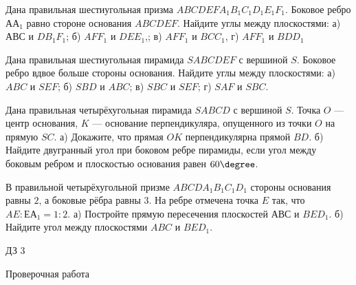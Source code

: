 \begin{homework}[number=2]
	\begin{listofex}
		\item Дана правильная шестиугольная призма \(ABCDEFA_1B_1C_1D_1E_1F_1\). Боковое ребро \(АА_1\) равно стороне основания \(ABCDEF\). Найдите углы между плоскостями: а) \(АВС\) и \(DB_1F_1\); б) \(AFF_1\) и \(DEE_1\),; в) \(AFF_1\) и \(BCC_1\), г) \(AFF_1\) и \(BDD_1\)
		\item Дана правильная шестиугольная пирамида \(SABCDEF\) с вершиной \(S\). Боковое ребро вдвое больше стороны основания. Найдите углы между плоскостями: а) \(ABC\) и \(SEF\); б) \(SBD\) и \(ABC\); в) \(SBC\) и \(SEF\); г) \(SAF\) и \(SBC\).
		\item Дана правильная четырёхугольная пирамида \(SABCD\) с вершиной \(S\). Точка \(O\) --- центр основания, \(K\) --- основание перпендикуляра, опущенного из точки \(O\) на прямую \(SC\). а) Докажите, что прямая \(OK\) перпендикулярна прямой \(BD\). б) Найдите двугранный угол при боковом ребре пирамиды, если угол между боковым ребром и плоскостью основания равен \(60 \degree \).
		\item В правильной четырёхугольной призме \(ABCDA_1B_1C_1D_1\) стороны основания равны \(2\), а боковые рёбра равны \(3\). На ребре отмечена точка \(E\) так, что \(AE: ЕА_1 = 1:2\). а) Постройте прямую пересечения плоскостей \(АВС\) и \(BED_1\). б) Найдите угол между плоскостями \(ABC\) и \(BED_1\).
	\end{listofex}
\end{homework}

\begin{homework}[number=3]
	\begin{listofex}
		\item ДЗ 3
	\end{listofex}
\end{homework}

\begin{exam}
	\begin{listofex}
		\item Проверочная работа
	\end{listofex}
\end{exam}


